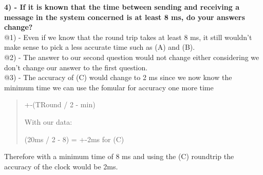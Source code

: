 \textbf{4) - If it is known that the time between sending and receiving a message in the system concerned is at least 8 ms, do your answers change?}\\

@1) - Even if we know that the round trip takes at least 8 ms, it still wouldn’t make sense to pick a less accurate time such as (A) and (B).\\

@2) - The answer to our second question would not change either considering we don’t change our answer to the first question.\\

@3) - The accuracy of (C) would change to 2 ms since we now know the minimum time we can use the fomular for accuracy one more time
\begin{quote}
+-(TRound / 2 - min)

With our data:

(20ms / 2 - 8) = +-2ms for (C)
\end{quote}
Therefore with a minimum time of 8 ms and using the (C) roundtrip the accuracy of the clock would be 2ms.
\newpage